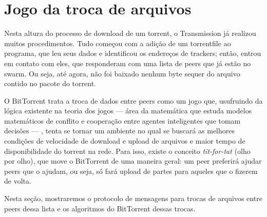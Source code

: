 
\newpage
\section{Jogo da troca de arquivos}
\label{sec:titfortat}

Nesta altura do processo de download de um \gls*{torrent}, o Transmission já realizou
muitos procedimentos. Tudo começou com a adição de um \gls*{torrentfile} ao programa,
que leu seus dados e identificou os endereços de \glspl*{tracker}; então, entrou em
contato com eles, que responderam com uma lista de \glspl*{peer} que já estão no
\gls*{swarm}. Ou seja, até agora, não foi baixado nenhum byte sequer do arquivo contido
no pacote do \gls*{torrent}.

O BitTorrent trata a troca de dados entre \glspl*{peer} como um jogo que, usufruindo
da lógica existente na teoria dos jogos --- área da matemática que estuda modelos
matemáticos de conflito e cooperação entre agentes inteligentes que tomam decisões ---
, tenta se tornar um ambiente no qual se buscará as melhores condições de velocidade
de download e upload de arquivos e maior tempo de disponibilidade do \gls*{torrent} na
rede. Para isso, existe o conceito \emph{tit-for-tat} (olho por olho), que move o
BitTorrent de uma maneira geral: um \gls*{peer} preferirá ajudar \glspl*{peer} que o
ajudam, ou seja, só fará upload de partes para aqueles que o fizerem de volta.

Nesta seção, mostraremos o protocolo de mensagens para trocas de arquivos entre
\glspl*{peer} dessa lista e os algoritmos do BitTorrent dessas trocas.







